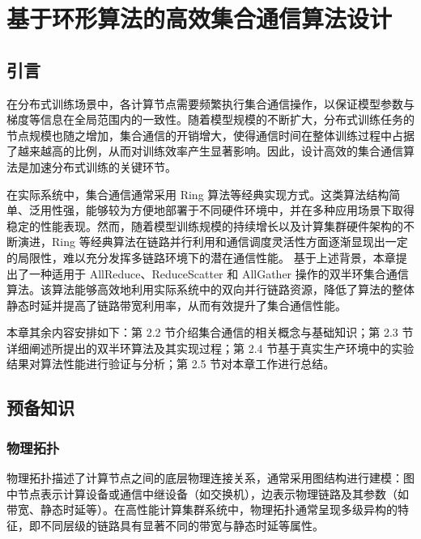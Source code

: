 \chapter{基于环形算法的高效集合通信算法设计}
\section{引言}

在分布式训练场景中，各计算节点需要频繁执行集合通信操作，以保证模型参数与梯度等信息在全局范围内的一致性。随着模型规模的不断扩大，分布式训练任务的节点规模也随之增加，集合通信的开销增大，使得通信时间在整体训练过程中占据了越来越高的比例，从而对训练效率产生显著影响。因此，设计高效的集合通信算法是加速分布式训练的关键环节。

在实际系统中，集合通信通常采用 Ring 算法等经典实现方式。这类算法结构简单、泛用性强，能够较为方便地部署于不同硬件环境中，并在多种应用场景下取得稳定的性能表现。然而，随着模型训练规模的持续增长以及计算集群硬件架构的不断演进，Ring 等经典算法在链路并行利用和通信调度灵活性方面逐渐显现出一定的局限性，难以充分发挥多链路环境下的潜在通信性能。
基于上述背景，本章提出了一种适用于 AllReduce、ReduceScatter 和 AllGather 操作的双半环集合通信算法。该算法能够高效地利用实际系统中的双向并行链路资源，降低了算法的整体静态时延并提高了链路带宽利用率，从而有效提升了集合通信性能。

本章其余内容安排如下：第 2.2 节介绍集合通信的相关概念与基础知识；第 2.3 节详细阐述所提出的双半环算法及其实现过程；第 2.4 节基于真实生产环境中的实验结果对算法性能进行验证与分析；第 2.5 节对本章工作进行总结。



\section{预备知识}



\subsection{物理拓扑}

物理拓扑描述了计算节点之间的底层物理连接关系，通常采用图结构进行建模：图中节点表示计算设备或通信中继设备（如交换机），边表示物理链路及其参数（如带宽、静态时延等）。在高性能计算集群系统中，物理拓扑通常呈现多级异构的特征，即不同层级的链路具有显著不同的带宽与静态时延等属性。

